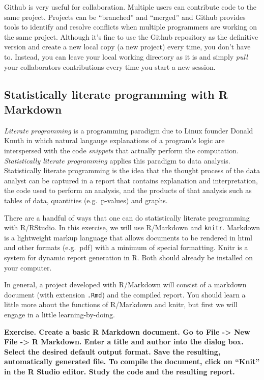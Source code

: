 \documentclass[]{article}
\begin{document}
Github is very useful for collaboration. Multiple users can contribute
code to the same project. Projects can be ``branched'' and ``merged''
and Github provides tools to identify and resolve conflicts when
multiple programmers are working on the same project. Although it's fine
to use the Github repository as the definitive version and create a new
local copy (a new project) every time, you don't have to. Instead, you
can leave your local working directory as it is and simply \emph{pull}
your collaborators contributions every time you start a new session.

\hypertarget{statistically-literate-programming-with-r-markdown}{%
\subsection{Statistically literate programming with R
Markdown}\label{statistically-literate-programming-with-r-markdown}}

\emph{Literate programming} is a programming paradigm due to Linux
founder Donald Knuth in which natural langauge explanations of a
program's logic are interspersed with the code \emph{snippets} that
actually perform the computation. \emph{Statistically literate
programming} applies this paradigm to data analysis. Statistically
literate programming is the idea that the thought process of the data
analyst can be captured in a report that contains explanation and
interpretation, the code used to perform an analysis, and the products
of that analysis such as tables of data, quantities (e.g.~p-values) and
graphs.

There are a handful of ways that one can do statistically literate
programming with R/RStudio. In this exercise, we will use R/Markdown and
\texttt{knitr}. Markdown is a lightweight markup language that allows
documents to be rendered in html and other formats (e.g.~pdf) with a
minimum of special formatting. Knitr is a system for dynamic report
generation in R. Both should already be installed on your computer.

In general, a project developed with R/Markdown will consist of a
markdown document (with extension \texttt{.Rmd}) and the compiled
report. You should learn a little more about the functions of R/Markdown
and knitr, but first we will engage in a little learning-by-doing.

\textbf{Exercise. Create a basic R Markdown document. Go to File
-\textgreater{} New File -\textgreater{} R Markdown. Enter a title and
author into the dialog box. Select the desired default output format.
Save the resulting, automatically generated file. To compile the
document, click on ``Knit'' in the R Studio editor. Study the code and
the resulting report.}
\end{document}
